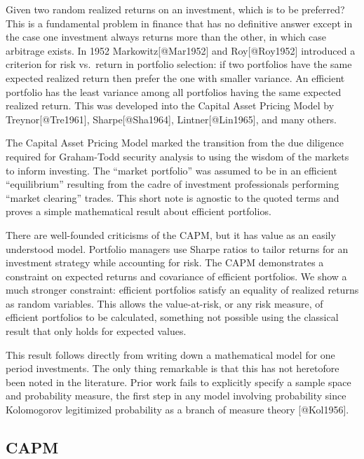 \newcommand\RR{\mathbf{R}}
\newcommand\BB{\mathcal{B}}
\newcommand\LL{\mathcal{L}}
\newcommand\Var{\operatorname{Var}}
\newcommand\Cov{\operatorname{Cov}}

Given two random realized returns on an investment, which is to be
preferred? This is a fundamental problem in finance that has no
definitive answer except in the case one investment always returns more
than the other, in which case arbitrage exists. In 1952
Markowitz{[}@Mar1952{]} and Roy{[}@Roy1952{]} introduced a criterion for
risk vs.~return in portfolio selection: if two portfolios have the same
expected realized return then prefer the one with smaller variance. An
efficient portfolio has the least variance among all portfolios having
the same expected realized return. This was developed into the Capital
Asset Pricing Model by Treynor{[}@Tre1961{]}, Sharpe{[}@Sha1964{]},
Lintner{[}@Lin1965{]}, and many others.

The Capital Asset Pricing Model marked the transition from the due
diligence required for Graham-Todd security analysis to using the wisdom
of the markets to inform investing. The ``market portfolio'' was assumed
to be in an efficient ``equilibrium'' resulting from the cadre of
investment professionals performing ``market clearing'' trades. This
short note is agnostic to the quoted terms and proves a simple
mathematical result about efficient portfolios.

There are well-founded criticisms of the CAPM, but it has value as an
easily understood model. Portfolio managers use Sharpe ratios to tailor
returns for an investment strategy while accounting for risk. The CAPM
demonstrates a constraint on expected returns and covariance of
efficient portfolios. We show a much stronger constraint: efficient
portfolios satisfy an equality of realized returns as random variables.
This allows the value-at-risk, or any risk measure, of efficient
portfolios to be calculated, something not possible using the classical
result that only holds for expected values.

This result follows directly from writing down a mathematical model for
one period investments. The only thing remarkable is that this has not
heretofore been noted in the literature. Prior work fails to explicitly
specify a sample space and probability measure, the first step in any
model involving probability since Kolomogorov legitimized probability as
a branch of measure theory {[}@Kol1956{]}.

\subsection{CAPM}\label{capm}

